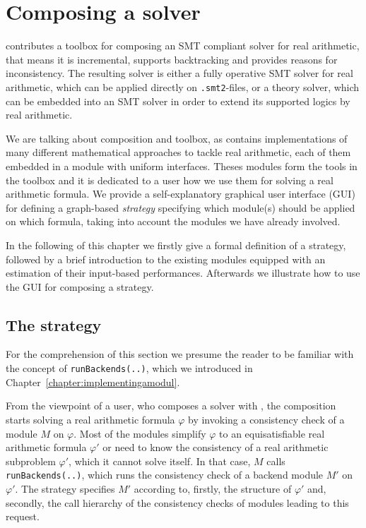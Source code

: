 \chapter{Composing a solver}
\label{chapter:composingats}
\smtrat contributes a toolbox for composing an SMT compliant solver for real arithmetic, that means it 
is incremental, supports backtracking and provides reasons for inconsistency. The resulting
solver is either a fully operative SMT solver for real arithmetic, which can be applied
directly on \texttt{.smt2}-files, or a theory solver, which can be embedded into an SMT 
solver in order to extend its supported logics by real arithmetic.

We are talking about composition and toolbox, as \smtrat contains implementations
of many different mathematical approaches to tackle real arithmetic, each of them
embedded in a module with uniform interfaces. Theses modules form the tools in the toolbox
and it is dedicated to a user how we use them for solving a real arithmetic formula.
We provide a self-explanatory graphical user interface (GUI) for defining a graph-based 
\emph{strategy} specifying which module(s) should be applied on which formula, 
taking into account the modules we have already involved.

In the following of this chapter we firstly give a formal definition of 
a strategy, followed by a brief introduction to the existing modules equipped
with an estimation of their input-based performances. Afterwards we illustrate
how to use the GUI for composing a strategy.

\section{The strategy}
For the comprehension of this section we presume the reader to be familiar with the
concept of \texttt{runBackends(..)}, which we introduced in Chapter~\ref{chapter:implementingamodul}.

From the viewpoint of a user, who composes a solver with \smtrat, the composition starts solving a real 
arithmetic formula $\varphi$ by invoking a consistency check of a module $M$ on $\varphi$. Most of
the modules simplify $\varphi$ to an equisatisfiable real arithmetic formula $\varphi'$ or need to 
know the consistency of a real arithmetic subproblem $\varphi'$, which it cannot
solve itself. In that case, $M$ calls \texttt{runBackends(..)}, which runs the consistency 
check of a backend module $M'$ on $\varphi'$. The strategy specifies $M'$ according to, firstly,
the structure of $\varphi'$ and, secondly, the call hierarchy of the consistency checks of modules
leading to this request. 

